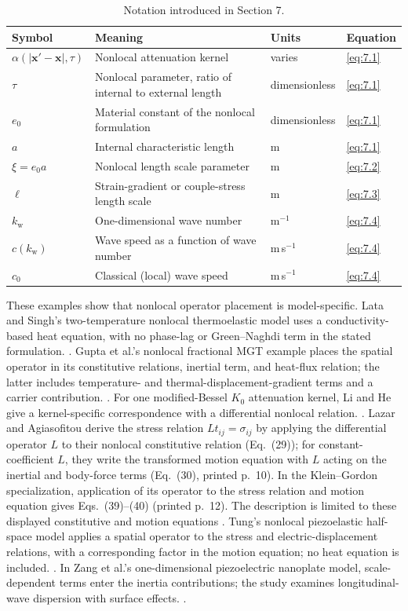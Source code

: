 \begin{table}[htbp]
\centering
\small
\caption{Notation introduced in Section 7.}
\label{tab:notation-sec7}
\begin{tabularx}{\textwidth}{@{}p{1.8cm}X p{2.2cm}p{2.1cm}@{}}
\toprule
\textbf{Symbol} & \textbf{Meaning} & \textbf{Units} & \textbf{Equation} \\
\midrule
$\alpha(|\bm{x}'-\bm{x}|,\tau)$ & Nonlocal attenuation kernel & varies & \eqref{eq:7.1} \\
$\tau$ & Nonlocal parameter, ratio of internal to external length & dimensionless & \eqref{eq:7.1} \\
$e_0$ & Material constant of the nonlocal formulation & dimensionless & \eqref{eq:7.1} \\
$a$ & Internal characteristic length & m & \eqref{eq:7.1} \\
$\xi = e_0 a$ & Nonlocal length scale parameter & m & \eqref{eq:7.2} \\
$\ell$ & Strain-gradient or couple-stress length scale & m & \eqref{eq:7.3} \\
$k_{\mathrm w}$ & One-dimensional wave number & m$^{-1}$ & \eqref{eq:7.4} \\
$c(k_{\mathrm w})$ & Wave speed as a function of wave number & m\,s$^{-1}$ & \eqref{eq:7.4} \\
$c_0$ & Classical (local) wave speed & m\,s$^{-1}$ & \eqref{eq:7.4} \\
\bottomrule
\end{tabularx}
\end{table}

These examples show that nonlocal operator placement is model-specific. Lata and Singh's two-temperature nonlocal thermoelastic model uses a conductivity-based heat equation, with no phase-lag or Green–Naghdi term in the stated formulation. \cite{Lata2020}. Gupta et al.'s nonlocal fractional MGT example places the spatial operator in its constitutive relations, inertial term, and heat-flux relation; the latter includes temperature- and thermal-displacement-gradient terms and a carrier contribution. \cite{Gupta2024}. For one modified-Bessel $K_0$ attenuation kernel, Li and He give a kernel-specific correspondence with a differential nonlocal relation. \cite{Li2018}. Lazar and Agiasofitou derive the stress relation \(L t_{ij}=\sigma_{ij}\) by applying the differential operator \(L\) to their nonlocal constitutive relation (Eq.~(29)); for constant-coefficient \(L\), they write the transformed motion equation with \(L\) acting on the inertial and body-force terms (Eq.~(30), printed p.~10). In the Klein--Gordon specialization, application of its operator to the stress relation and motion equation gives Eqs.~(39)--(40) (printed p.~12). The description is limited to these displayed constitutive and motion equations \cite{Lazar2022}. Tung's nonlocal piezoelastic half-space model applies a spatial operator to the stress and electric-displacement relations, with a corresponding factor in the motion equation; no heat equation is included. \cite{Tung2019}. In Zang et al.'s one-dimensional piezoelectric nanoplate model, scale-dependent terms enter the inertia contributions; the study examines longitudinal-wave dispersion with surface effects. \cite{Zang2014}.

